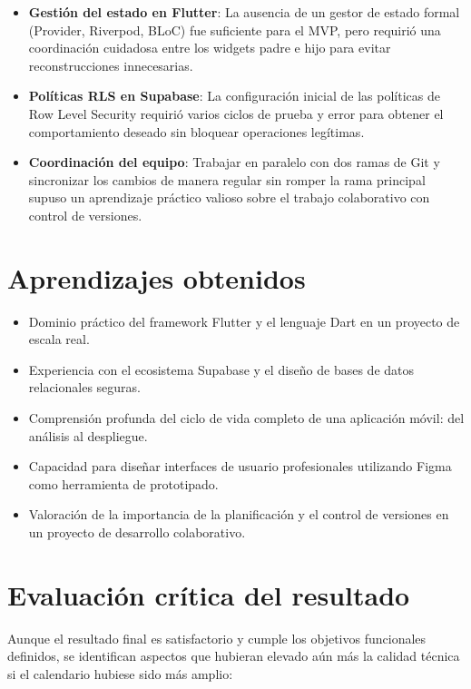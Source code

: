 \begin{itemize}
  \item \textbf{Gestión del estado en Flutter}: La ausencia de un gestor de estado formal (Provider, Riverpod, BLoC) fue suficiente para el MVP, pero requirió una coordinación cuidadosa entre los widgets padre e hijo para evitar reconstrucciones innecesarias.
  \item \textbf{Políticas RLS en Supabase}: La configuración inicial de las políticas de Row Level Security requirió varios ciclos de prueba y error para obtener el comportamiento deseado sin bloquear operaciones legítimas.
  \item \textbf{Coordinación del equipo}: Trabajar en paralelo con dos ramas de Git y sincronizar los cambios de manera regular sin romper la rama principal supuso un aprendizaje práctico valioso sobre el trabajo colaborativo con control de versiones.
\end{itemize}

\section{Aprendizajes obtenidos}

\begin{itemize}
  \item Dominio práctico del framework Flutter y el lenguaje Dart en un proyecto de escala real.
  \item Experiencia con el ecosistema Supabase y el diseño de bases de datos relacionales seguras.
  \item Comprensión profunda del ciclo de vida completo de una aplicación móvil: del análisis al despliegue.
  \item Capacidad para diseñar interfaces de usuario profesionales utilizando Figma como herramienta de prototipado.
  \item Valoración de la importancia de la planificación y el control de versiones en un proyecto de desarrollo colaborativo.
\end{itemize}

\section{Evaluación crítica del resultado}

Aunque el resultado final es satisfactorio y cumple los objetivos funcionales definidos, se identifican aspectos que hubieran elevado aún más la calidad técnica si el calendario hubiese sido más amplio:

